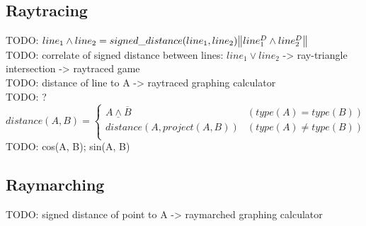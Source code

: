 \documentclass[twoside]{article}
\newcommand{\norm}[1]{{\left\lVert{#1}\right\rVert}}
\begin{document}
\begin{multicols*}{2}
            \subsection{Raytracing}
                \par
                    TODO: $ line_1 \wedge line_2 \\= signed\_distance(line_1, line_2) \norm{line_1^D \wedge line_2^D} $ \\
                    TODO: correlate of signed distance between lines: $ line_1 \vee line_2 $ -> ray-triangle intersection -> raytraced game \\
                    TODO: distance of line to A -> raytraced graphing calculator \\
                    TODO: ?
                    $$ distance(A, B) = \begin{cases}
                        \underline{A \wedge \overline{B}} & (type(A) = type(B)) \\
                        distance(A, project(A, B)) & (type(A) \ne type(B)) \\
                    \end{cases} $$
                    TODO: cos(A, B); sin(A, B)
            \subsection{Raymarching}
                    TODO: signed distance of point to A -> raymarched graphing calculator \\
            \subsection{}

\end{multicols*}
\end{document}
